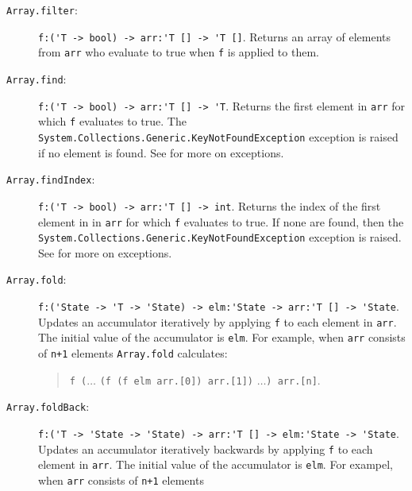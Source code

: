\begin{description}
\item[\texttt{Array.filter}:] \lstinline{f:('T -> bool) -> arr:'T [] -> 'T []}. Returns an array of elements from \lstinline{arr} who evaluate to true when \lstinline{f} is applied to them.
\item[\texttt{Array.find}:] \lstinline{f:('T -> bool) -> arr:'T [] -> 'T}. Returns the first element in \lstinline{arr} for which \lstinline{f} evaluates to true. The \lstinline{System.Collections.Generic.KeyNotFoundException} exception is raised if no element is found.  See  for more on exceptions.
    
\item[\texttt{Array.findIndex}:] \lstinline{f:('T -> bool) -> arr:'T [] -> int}. Returns the index of the first element in in \lstinline{arr} for which \lstinline{f} evaluates to true. If none are found, then the \lstinline{System.Collections.Generic.KeyNotFoundException} exception is raised.  See  for more on exceptions.
\item[\texttt{Array.fold}:] \lstinline{f:('State -> 'T -> 'State) -> elm:'State -> arr:'T [] -> 'State}. Updates an accumulator iteratively by applying \lstinline{f} to each element in \lstinline{arr}. The initial value of the accumulator is \lstinline{elm}. For example, when \lstinline{arr} consists of \lstinline{n+1} elements
  \lstinline{Array.fold} calculates:
  \begin{quote}
    \lstinline{f (}$\ldots$ \lstinline{(f (f elm arr.[0]) arr.[1])} $\ldots$\lstinline{) arr.[n]}.
  \end{quote}
\item[\texttt{Array.foldBack}:] \lstinline{f:('T -> 'State -> 'State) -> arr:'T [] -> elm:'State -> 'State}. Updates an accumulator iteratively backwards by applying \lstinline{f} to each element in \lstinline{arr}. The initial value of the accumulator is \lstinline{elm}. For exampel, when \lstinline{arr} consists of \lstinline{n+1} elements

\end{description}
